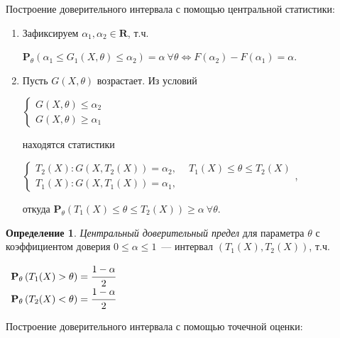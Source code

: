 \documentclass[oneside,final,14pt]{extreport}
\theoremstyle{definition}
\newtheorem{defn}{Определение}[section]
\begin{document}
Построение доверительного интервала с помощью центральной статистики:
\begin{enumerate}
    \item Зафиксируем \( \alpha_{1}, \alpha_{2} \in \mathbf{R}\), т.ч.
    
    \(\mathbf{P}_{\theta}(\alpha_{1} \leq G_{1}(X, \theta) \leq \alpha_{2})=\alpha~\forall \theta \Leftrightarrow F(\alpha_{2})-F(\alpha_{1})=\alpha\).
    \item Пусть \(G(X,\theta)\) возрастает. Из условий
    
    \( \left\{\begin{array}{l}
    G(X, \theta) \leq \alpha_{2} \\
    G(X, \theta) \geq \alpha_{1}
    \end{array}\right. \)
    
    находятся статистики
    
    \(
    \left\{\begin{array}{l}
    T_{2}(X): G\left(X, T_{2}(X)\right)=\alpha_{2}, \quad \ T_{1}(X) \leq \theta \leq T_{2}(X) \\
    T_{1}(X): G\left(X, T_{1}(X)\right)=\alpha_{1},
    \end{array}\right.
    \),
    
    откуда \( \mathbf{P}_{\theta}\left(T_{1}(X) \leq \theta \leq T_{2}(X)\right) \geq \alpha~ \forall \theta \).
\end{enumerate}

\begin{defn}
{\it Центральный доверительный предел} для параметра \(\theta\) с коэффициентом доверия \(0 \leq \alpha \leq 1\)~--- интервал \((T_1(X), T_2(X))\), т.ч. 

\(
\begin{array}{l}
\mathbf{P}_{\theta}\left(T_{1}(X)>\theta\right)=\cfrac{1-\alpha}{2} \\
\mathbf{P}_{\theta}\left(T_{2}(X)<\theta\right)=\cfrac{1-\alpha}{2}
\end{array}
\)
\end{defn}

Построение доверительного интервала с помощью точечной оценки:
\end{document}
